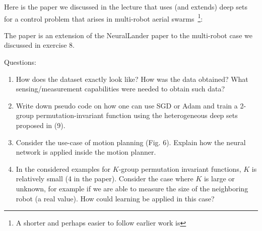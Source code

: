 

\renewcommand{\course}{Robot Learning}
\renewcommand{\coursedate}{Summer 2024}
\renewcommand{\exnum}{Weekly Exercise 11}

\renewcommand{\teacher}{Marc Toussaint \& Wolfgang H{\"o}nig}
\renewcommand{\addressTUB}{
  Learning~\&~Intelligent~Systems Lab, Intelligent Multi-Robot Coordination Lab, TU~Berlin\\\small
  Marchstr. 23, 10587 Berlin, Germany
}

\exercises

\ifthenelse{\isundefined{\scripthead}}{
  \usepackage{tikz}
  \usetikzlibrary{shapes,snakes}
  \usepackage{tkz-base}
  \usepackage{tkz-euclide}
}{}




\exercisestitle



Here is the paper we discussed in the lecture that uses (and extends) deep sets for a control problem that arises in multi-robot aerial swarms~\footnote{A shorter and perhaps easier to follow earlier work is
}:


The paper is an extension of the NeuralLander paper to the multi-robot case we discussed in exercise 8. 

Questions:
\begin{enumerate}
\item How does the dataset exactly look like? How was the data obtained? What sensing/measurement capabilities were needed to obtain such data?


\item Write down pseudo code on how one can use SGD or Adam and train a 2-group permutation-invariant function using the heterogeneous deep sets proposed in (9).


\item Consider the use-case of motion planning (Fig. 6). Explain how the neural network is applied inside the motion planner.


\item In the considered examples for $K$-group permutation invariant functions, $K$ is relatively small (4 in the paper). Consider the case where $K$ is large or unknown, for example if we are able to measure the size of the neighboring robot (a real value). How could learning be applied in this case?


\end{enumerate}

